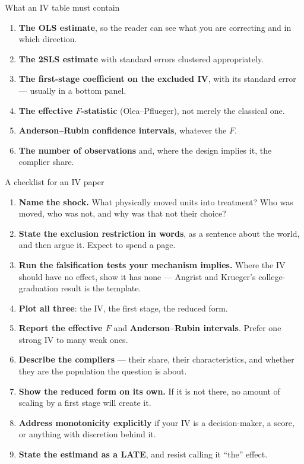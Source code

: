 \documentclass[
  11pt,
  ignorenonframetext,
  aspectratio=169,
]{beamer}
\newcounter{none} %
\providecommand{\tightlist}{%
  \setlength{\itemsep}{0pt}\setlength{\parskip}{0pt}}
\begin{document}
\begin{frame}{What an IV table must contain}
\protect{}\label{what-an-iv-table-must-contain}
\begin{enumerate}
\tightlist
\item
  \textbf{The OLS estimate}, so the reader can see what you are
  correcting and in which direction.
\item
  \textbf{The 2SLS estimate} with standard errors clustered
  appropriately.
\item
  \textbf{The first-stage coefficient on the excluded IV}, with its
  standard error --- usually in a bottom panel.
\item
  \textbf{The effective \(F\)-statistic} (Olea--Pflueger), not merely
  the classical one.
\item
  \textbf{Anderson--Rubin confidence intervals}, whatever the \(F\).
\item
  \textbf{The number of observations} and, where the design implies it,
  the complier share.
\end{enumerate}
\end{frame}

\begin{frame}{A checklist for an IV paper}
\protect{}\label{a-checklist-for-an-iv-paper}
\small

\begin{enumerate}
\tightlist
\item
  \textbf{Name the shock.} What physically moved units into treatment?
  Who was moved, who was not, and why was that not their choice?
\item
  \textbf{State the exclusion restriction in words}, as a sentence about
  the world, and then argue it. Expect to spend a page.
\item
  \textbf{Run the falsification tests your mechanism implies.} Where the
  IV should have no effect, show it has none --- Angrist and Krueger's
  college-graduation result is the template.
\item
  \textbf{Plot all three}: the IV, the first stage, the reduced form.
\item
  \textbf{Report the effective \(F\)} and \textbf{Anderson--Rubin
  intervals}. Prefer one strong IV to many weak ones.
\item
  \textbf{Describe the compliers} --- their share, their
  characteristics, and whether they are the population the question is
  about.
\item
  \textbf{Show the reduced form on its own.} If it is not there, no
  amount of scaling by a first stage will create it.
\item
  \textbf{Address monotonicity explicitly} if your IV is a
  decision-maker, a score, or anything with discretion behind it.
\item
  \textbf{State the estimand as a LATE}, and resist calling it ``the''
  effect.
\end{enumerate}
\end{frame}
\end{document}
